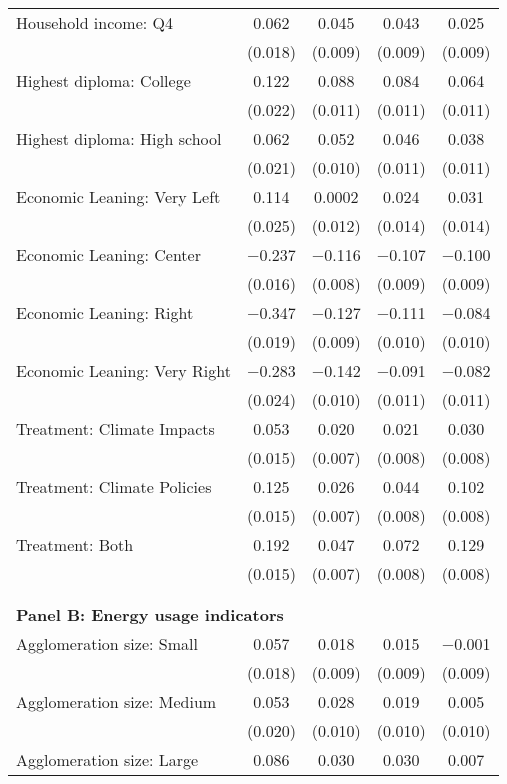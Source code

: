 \begin{tabular}{@{\extracolsep{5pt}}lcccc}
  Household income: Q4 & 0.062 & 0.045 & 0.043 & 0.025 \\ 
  & (0.018) & (0.009) & (0.009) & (0.009) \\ 
  Highest diploma: College & 0.122 & 0.088 & 0.084 & 0.064 \\ 
  & (0.022) & (0.011) & (0.011) & (0.011) \\ 
  Highest diploma: High school & 0.062 & 0.052 & 0.046 & 0.038 \\ 
  & (0.021) & (0.010) & (0.011) & (0.011) \\ 
  Economic Leaning: Very Left & 0.114 & 0.0002 & 0.024 & 0.031 \\ 
  & (0.025) & (0.012) & (0.014) & (0.014) \\ 
  Economic Leaning: Center & $-$0.237 & $-$0.116 & $-$0.107 & $-$0.100 \\ 
  & (0.016) & (0.008) & (0.009) & (0.009) \\ 
  Economic Leaning: Right & $-$0.347 & $-$0.127 & $-$0.111 & $-$0.084 \\ 
  & (0.019) & (0.009) & (0.010) & (0.010) \\ 
  Economic Leaning: Very Right & $-$0.283 & $-$0.142 & $-$0.091 & $-$0.082 \\ 
  & (0.024) & (0.010) & (0.011) & (0.011) \\ 
  Treatment: Climate Impacts & 0.053 & 0.020 & 0.021 & 0.030 \\ 
  & (0.015) & (0.007) & (0.008) & (0.008) \\ 
  Treatment: Climate Policies & 0.125 & 0.026 & 0.044 & 0.102 \\ 
  & (0.015) & (0.007) & (0.008) & (0.008) \\ 
  Treatment: Both & 0.192 & 0.047 & 0.072 & 0.129 \\ 
  & (0.015) & (0.007) & (0.008) & (0.008) \\ 
 \\[1ex] \hline \\[1ex]
\multicolumn{ 5 }{l}{\textbf{ Panel B: Energy usage indicators }} \\
  Agglomeration size: Small & 0.057 & 0.018 & 0.015 & $-$0.001 \\ 
  & (0.018) & (0.009) & (0.009) & (0.009) \\ 
  Agglomeration size: Medium & 0.053 & 0.028 & 0.019 & 0.005 \\ 
  & (0.020) & (0.010) & (0.010) & (0.010) \\ 
  Agglomeration size: Large & 0.086 & 0.030 & 0.030 & 0.007 \\ 

\end{tabular}
